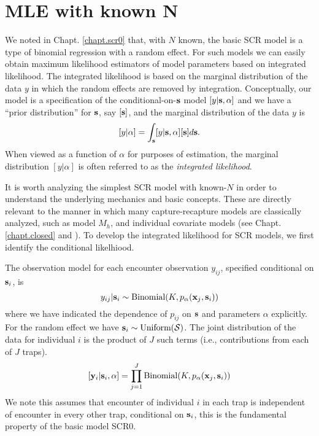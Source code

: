 \section{MLE with known N}

We noted in Chapt. \ref{chapt.scr0} that, with $N$ known, the basic SCR model is a
type of binomial regression with a random effect. For such models we
can easily obtain maximum likelihood estimators of model parameters
based on integrated likelihood. The integrated likelihood is based on
the marginal distribution of the data $y$ in which the random effects
are removed by integration. Conceptually, our model is a specification
of the conditional-on-${\bf s}$ model $[y|{\bf s},\alpha]$ and we have
a ``prior distribution'' for ${\bf s}$, say $[{\bf s}]$, and the
marginal distribution of the data $y$ is
\[
[y|\alpha] =  \int_{\bf s} [y|{\bf s},\alpha][{\bf s}] d{\bf s}.
\]
When viewed as a function of $\alpha$ for purposes of estimation, the
marginal distribution $[y|\alpha]$ is often referred to as the {\it
  integrated likelihood}.

It is worth analyzing 
the simplest SCR model with known-$N$ in order to understand the
underlying mechanics and basic concepts. These are directly relevant to
the manner in which many capture-recapture models are classically
analyzed, such as model $M_h$, and individual covariate models (see
Chapt. \ref{chapt.closed} and  \citet[][chapt. 6]{royle_dorazio:2008}). To develop the integrated
likelihood for SCR models, we first identify the conditional
likelhiood. 

The observation model for each encounter observation $y_{ij}$,
specified conditional on ${\bf s}_{i}$, is 
\begin{equation}
y_{ij}| {\bf s}_{i} \sim \mbox{Binomial}(K, p_{\alpha}({\bf x}_{j},{\bf s}_{i}))
\label{mle.eq.cond-on-s}
\end{equation}
where we have indicated the dependence of $p_{ij}$ on ${\bf s}$ and
parameters $\alpha$
explicitly.
For the random effect we have ${\bf s}_{i} \sim  \mbox{Uniform}({\cal
  S})$.
The joint distribution of the data for individual $i$ is the product
of $J$ such terms (i.e., contributions from each of $J$ traps).
\[
  [{\bf y}_{i} | {\bf s}_{i} , \alpha] = 
  \prod_{j=1}^{J} \mbox{Binomial}(K, p_{\alpha}({\bf x}_{j},{\bf s}_{i}) )
\]
We note this assumes that encounter of individual $i$ in each
trap is independent of encounter in every other trap, conditional on
${\bf s}_{i}$, this is the fundamental property of the basic model SCR0.


